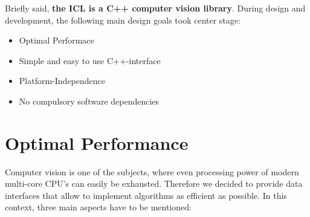 Briefly said, \textbf{the ICL is a C++ computer vision library}. During design and development, the following main design goals took center stage: 
\begin{itemize}
\item Optimal Performace
\item Simple and easy to use C++-interface
\item Platform-Independence 
\item No compulsory software dependencies
\end{itemize}


\section{Optimal Performance} 
Computer vision is one of the subjects, where even processing power of modern multi-core CPU's can easily be exhausted. Therefore we decided to provide data interfaces that allow to implement algorithms as efficient as possible. In this context, three main aspects have to be mentioned:
